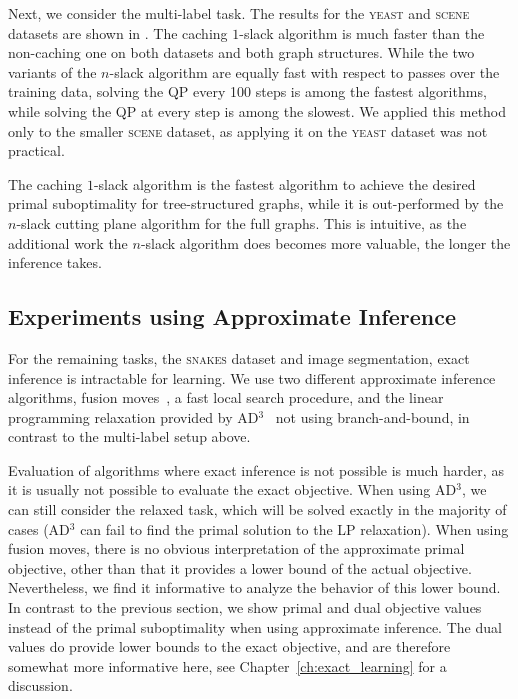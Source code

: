 Next, we consider the multi-label task.  The results for the \textsc{yeast} and \textsc{scene}
datasets are shown in . The caching $1$-slack
algorithm is much faster than the non-caching one on both datasets and both
graph structures.
While the two variants of the $n$-slack algorithm are equally fast with respect
to passes over the training data, solving the QP every 100 steps is among the
fastest algorithms, while solving the QP at every step is among the slowest.
We applied this method only to the smaller \textsc{scene} dataset, as applying it on the
\textsc{yeast} dataset was not practical.

The caching $1$-slack algorithm is the fastest algorithm to achieve the desired
primal suboptimality for tree-structured graphs, while it is out-performed by
the $n$-slack cutting plane algorithm for the full graphs. This is intuitive,
as the additional work the $n$-slack algorithm does becomes more valuable, the
longer the inference takes. 



\subsection{Experiments using Approximate Inference}
For the remaining tasks, the \textsc{snakes} dataset and image segmentation, exact
inference is intractable for learning.
%
We use two different approximate inference algorithms, fusion
moves~\citep{lempitsky2010fusion}, a fast local search procedure, and the
linear programming relaxation provided by AD$^3$~\citep{martins2011augmented}
not using branch-and-bound, in contrast to the multi-label setup above.

Evaluation of algorithms where exact inference is not possible is much harder,
as it is usually not possible to evaluate the exact objective. When using AD$^3$,
we can still consider the relaxed task, which will be solved exactly in the
majority of cases (AD$^3$ can fail to find the primal solution to the LP
relaxation).
When using fusion moves, there is no obvious interpretation of the approximate
primal objective, other than that it provides a lower bound of the actual
objective. Nevertheless, we find it informative to analyze the behavior of this
lower bound. In contrast to the previous section, we show primal and dual objective
values instead of the primal suboptimality when using approximate inference.
The dual values do provide lower bounds
to the exact objective, and are therefore somewhat more informative here, see
Chapter~\ref{ch:exact_learning} for a discussion.

